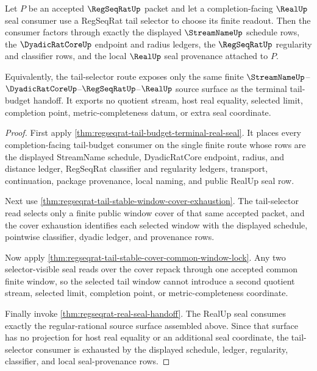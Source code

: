 \begin{theorem}
\label{thm:regseqrat-tail-selector-real-seal-exhaustion}
Let $P$ be an accepted $\RegSeqRatUp$ packet and let a completion-facing
$\RealUp$ seal consumer use a RegSeqRat tail selector to choose its finite
readout. Then the consumer factors through exactly the displayed
$\StreamNameUp$ schedule rows, the $\DyadicRatCoreUp$ endpoint and radius
ledgers, the $\RegSeqRatUp$ regularity and classifier rows, and the local
$\RealUp$ seal provenance attached to $P$.

Equivalently, the tail-selector route exposes only the same finite
$\StreamNameUp$--$\DyadicRatCoreUp$--$\RegSeqRatUp$--$\RealUp$ source surface
as the terminal tail-budget handoff. It exports no quotient stream, host real
equality, selected limit, completion point, metric-completeness datum, or extra
seal coordinate.
\end{theorem}
\begin{proof}
First apply \autoref{thm:regseqrat-tail-budget-terminal-real-seal}. It places
every completion-facing tail-budget consumer on the single finite route whose
rows are the displayed StreamName schedule, DyadicRatCore endpoint, radius, and
distance ledger, RegSeqRat classifier and regularity ledgers, transport,
continuation, package provenance, local naming, and public RealUp seal row.

Next use \autoref{thm:regseqrat-tail-stable-window-cover-exhaustion}. The
tail-selector read selects only a finite public window cover of that same
accepted packet, and the cover exhaustion identifies each selected window with
the displayed schedule, pointwise classifier, dyadic ledger, and provenance
rows.

Now apply \autoref{thm:regseqrat-tail-stable-cover-common-window-lock}. Any two
selector-visible seal reads over the cover repack through one accepted common
finite window, so the selected tail window cannot introduce a second quotient
stream, selected limit, completion point, or metric-completeness coordinate.

Finally invoke \autoref{thm:regseqrat-real-seal-handoff}. The RealUp seal
consumes exactly the regular-rational source surface assembled above. Since
that surface has no projection for host real equality or an additional seal
coordinate, the tail-selector consumer is exhausted by the displayed schedule,
ledger, regularity, classifier, and local seal-provenance rows.
\end{proof}


